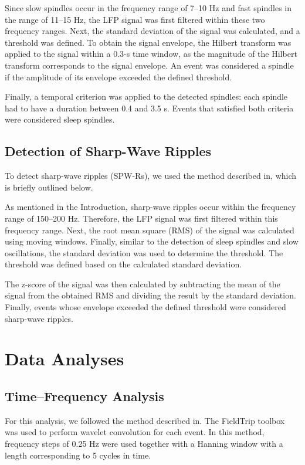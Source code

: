 \documentclass[12pt]{report}
\begin{document}
	Since slow spindles occur in the frequency range of 7–10 Hz and fast spindles in the range of 11–15 Hz, the LFP signal was first filtered within these two frequency ranges. Next, the standard deviation of the signal was calculated, and a threshold was defined. To obtain the signal envelope, the Hilbert transform was applied to the signal within a 0.3-s time window, as the magnitude of the Hilbert transform corresponds to the signal envelope. An event was considered a spindle if the amplitude of its envelope exceeded the defined threshold.
	
	Finally, a temporal criterion was applied to the detected spindles: each spindle had to have a duration between 0.4 and 3.5 s. Events that satisfied both criteria were considered sleep spindles.
	\subsection{Detection of Sharp-Wave Ripples}
	\label{Detection of Sharp-Wave Ripples}
	To detect sharp-wave ripples (SPW-Rs), we used the method described in\cite{Peyrache2011}, which is briefly outlined below.
	
	As mentioned in the Introduction, sharp-wave ripples occur within the frequency range of 150–200 Hz. Therefore, the LFP signal was first filtered within this frequency range. Next, the root mean square (RMS) of the signal was calculated using moving windows. Finally, similar to the detection of sleep spindles and slow oscillations, the standard deviation was used to determine the threshold. The threshold was defined based on the calculated standard deviation.
	
	The z-score of the signal was then calculated by subtracting the mean of the signal from the obtained RMS and dividing the result by the standard deviation. Finally, events whose envelope exceeded the defined threshold were considered sharp-wave ripples.
	\section{Data Analyses}
	\label{Data Analyses}
	\subsection{Time–Frequency Analysis}
	\label{Time–Frequency Analysis}
	For this analysis, we followed the method described in\cite{Bernhard2022}. The FieldTrip toolbox was used to perform wavelet convolution for each event. In this method, frequency steps of 0.25 Hz were used together with a Hanning window with a length corresponding to 5 cycles in time.
	
\end{document}
